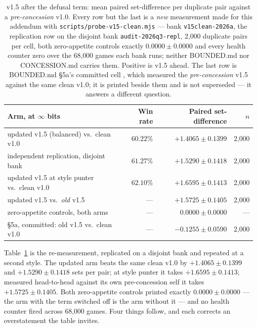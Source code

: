 \documentclass[11pt]{article}
\newcommand{\code}[1]{\texttt{#1}}
\begin{document}
\begin{table}[t]
\centering
\caption{v1.5 after the defusal term: mean paired set-difference per duplicate pair against a
\emph{pre-concession} v1.0. Every row but the last is a \emph{new} measurement made for this
addendum with \code{scripts/probe-v15-clean.mjs} \cite{v15clean} --- bank \code{v15clean-2026a},
the replication row on the disjoint bank \code{audit-2026q3-repl}, 2{,}000 duplicate pairs per
cell, both zero-appetite controls exactly $0.0000 \pm 0.0000$ and every health counter zero over
the 68{,}000 games each bank runs; neither BOUNDED.md nor CONCESSION.md carries them. Positive is
v1.5 ahead. The last row is BOUNDED.md \S5a's committed cell \cite{bounded}, which measured the
\emph{pre-concession} v1.5 against the same clean v1.0; it is printed beside them and is not
superseded --- it answers a different question.}
\label{tab:defusal}
\footnotesize
\begin{tabular}{@{}lrrr@{}}
\toprule
Arm, at $\infty$ bits & Win rate & Paired set-difference & $n$ \\
\midrule
updated v1.5 (balanced) vs.\ clean v1.0      & $60.22\%$ & $+1.4065 \pm 0.1399$ & 2{,}000 \\
independent replication, disjoint bank       & $61.27\%$ & $+1.5290 \pm 0.1418$ & 2{,}000 \\
updated v1.5 at style punter vs.\ clean v1.0 & $62.10\%$ & $+1.6595 \pm 0.1413$ & 2{,}000 \\
updated v1.5 vs.\ \emph{old} v1.5             & ---       & $+1.5725 \pm 0.1405$ & 2{,}000 \\
\midrule
zero-appetite controls, both arms            & ---       & $0.0000 \pm 0.0000$  & --- \\
\midrule
\S5a, committed: old v1.5 vs.\ clean v1.0    & ---       & $-0.1255 \pm 0.0590$ & 2{,}000 \\
\bottomrule
\end{tabular}
\end{table}

Table~\ref{tab:defusal} is the re-measurement, replicated on a disjoint bank and repeated at a
second style. The updated arm beats the same clean v1.0 by $+1.4065 \pm 0.1399$ and
$+1.5290 \pm 0.1418$ sets per pair; at style punter it takes $+1.6595 \pm 0.1413$; measured
head-to-head against its own pre-concession self it takes $+1.5725 \pm 0.1405$. Both
zero-appetite controls printed exactly $0.0000 \pm 0.0000$ --- the arm with the term switched off
is the arm without it --- and no health counter fired across 68{,}000 games. Four things follow,
and each corrects an overstatement the table invites.
\end{document}
